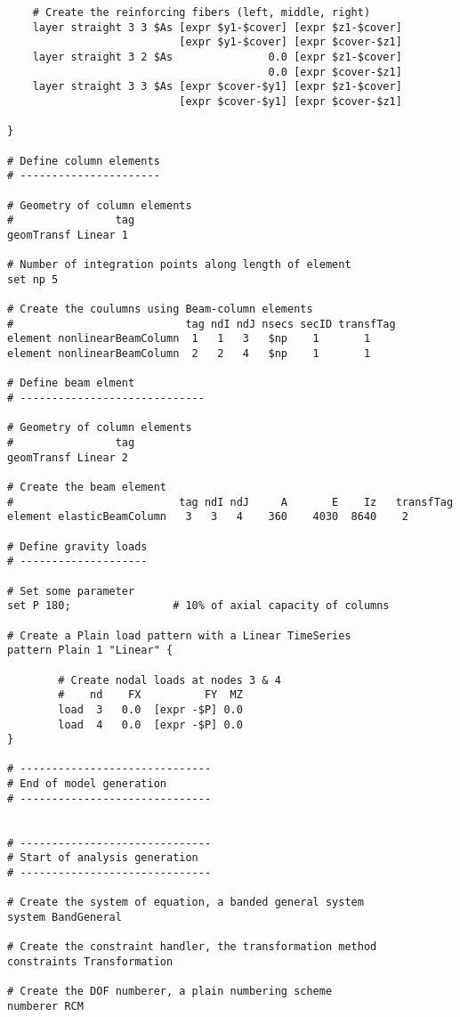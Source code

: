 \documentclass[12pt]{article}
\begin{document}
{\begin{verbatim}
    # Create the reinforcing fibers (left, middle, right)
    layer straight 3 3 $As [expr $y1-$cover] [expr $z1-$cover] 
                           [expr $y1-$cover] [expr $cover-$z1]
    layer straight 3 2 $As               0.0 [expr $z1-$cover] 
                                         0.0 [expr $cover-$z1]
    layer straight 3 3 $As [expr $cover-$y1] [expr $z1-$cover] 
                           [expr $cover-$y1] [expr $cover-$z1]

}    

# Define column elements
# ----------------------

# Geometry of column elements
#                tag 
geomTransf Linear 1  

# Number of integration points along length of element
set np 5

# Create the coulumns using Beam-column elements
#                           tag ndI ndJ nsecs secID transfTag
element nonlinearBeamColumn  1   1   3   $np    1       1
element nonlinearBeamColumn  2   2   4   $np    1       1

# Define beam elment
# -----------------------------

# Geometry of column elements
#                tag 
geomTransf Linear 2  

# Create the beam element
#                          tag ndI ndJ     A       E    Iz   transfTag
element elasticBeamColumn   3   3   4    360    4030  8640    2

# Define gravity loads
# --------------------

# Set some parameter
set P 180;                # 10% of axial capacity of columns

# Create a Plain load pattern with a Linear TimeSeries
pattern Plain 1 "Linear" {

        # Create nodal loads at nodes 3 & 4
        #    nd    FX          FY  MZ 
        load  3   0.0  [expr -$P] 0.0
        load  4   0.0  [expr -$P] 0.0
}

# ------------------------------
# End of model generation
# ------------------------------


# ------------------------------
# Start of analysis generation
# ------------------------------

# Create the system of equation, a banded general system
system BandGeneral

# Create the constraint handler, the transformation method
constraints Transformation

# Create the DOF numberer, a plain numbering scheme
numberer RCM


\end{verbatim}}
\end{document}
